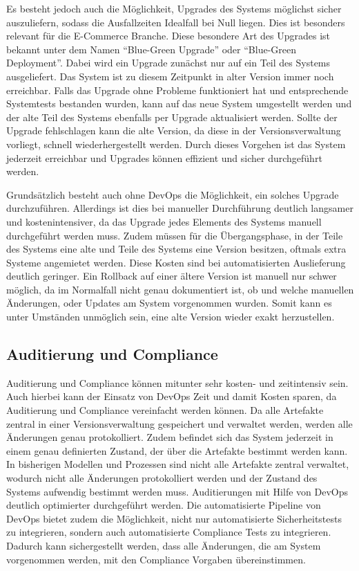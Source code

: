 Es besteht jedoch auch die Möglichkeit, Upgrades des Systems möglichst sicher auszuliefern, sodass die Ausfallzeiten Idealfall bei Null liegen. 
Dies ist besonders relevant für die E-Commerce Branche. 
Diese besondere Art des Upgrades ist bekannt unter dem Namen \enquote{Blue-Green Upgrade} oder \enquote{Blue-Green Deployment}. 
Dabei wird ein Upgrade zunächst nur auf ein Teil des Systems ausgeliefert. Das System ist zu diesem Zeitpunkt in alter Version immer noch erreichbar. 
Falls das Upgrade ohne Probleme funktioniert hat und entsprechende Systemtests bestanden wurden, kann auf das neue System umgestellt werden und der alte Teil des Systems ebenfalls per Upgrade aktualisiert werden. 
Sollte der Upgrade fehlschlagen kann die alte Version, da diese in der Versionsverwaltung vorliegt, schnell wiederhergestellt werden. 
Durch dieses Vorgehen ist das System jederzeit erreichbar und Upgrades können effizient und sicher durchgeführt werden.
\parencite[Vgl.][S. 103 f.]{bass:2015}

Grundsätzlich besteht auch ohne DevOps die Möglichkeit, ein solches Upgrade durchzuführen. 
Allerdings ist dies bei manueller Durchführung deutlich langsamer und kostenintensiver, da das Upgrade jedes Elements des Systems manuell durchgeführt werden muss. 
Zudem müssen für die Übergangsphase, in der Teile des Systems eine alte und Teile des Systems eine Version besitzen, oftmals extra Systeme angemietet werden. 
Diese Kosten sind bei automatisierten Auslieferung deutlich geringer. 
Ein Rollback auf einer ältere Version ist manuell nur schwer möglich, da im Normalfall nicht genau dokumentiert ist, ob und welche manuellen Änderungen, oder Updates am System vorgenommen wurden. 
Somit kann es unter Umständen unmöglich sein, eine alte Version wieder exakt herzustellen. \parencite[Vgl.][S. 23]{fisher-miranda:2014}

\subsection{Auditierung und Compliance}
Auditierung und Compliance können mitunter sehr kosten- und zeitintensiv sein. Auch hierbei kann der Einsatz von DevOps Zeit und damit Kosten sparen, da Auditierung und Compliance vereinfacht werden können. 
Da alle Artefakte zentral in einer Versionsverwaltung gespeichert und verwaltet werden, werden alle Änderungen genau protokolliert. 
Zudem befindet sich das System jederzeit in einem genau definierten Zustand, der über die Artefakte bestimmt werden kann. 
In bisherigen Modellen und Prozessen sind nicht alle Artefakte zentral verwaltet, wodurch nicht alle Änderungen protokolliert werden und der Zustand des Systems aufwendig bestimmt werden muss. 
Auditierungen mit Hilfe von DevOps deutlich optimierter durchgeführt werden. 
Die automatisierte Pipeline von DevOps bietet zudem die Möglichkeit, nicht nur automatisierte Sicherheitstests zu integrieren, sondern auch automatisierte Compliance Tests zu integrieren. 
Dadurch kann sichergestellt werden, dass alle Änderungen, die am System vorgenommen werden, mit den Compliance Vorgaben übereinstimmen. \parencite[Vgl.][S. 24]{fisher-miranda:2014}

